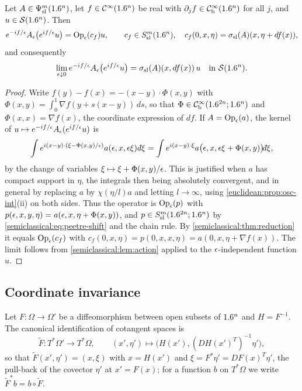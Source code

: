 \begin{proposition}\label{semiclassical:prop:oscillatory}
  Let $A\in\Psi^{m}_{\mathrm{sl}}(1.6^n)$, let $f\in\mathcal{C}^\infty(1.6^n)$ be real with $\partial_jf\in\mathcal{C}^\infty_{\mathrm{b}}(1.6^n)$
  for all $j$, and $u\in\mathcal{S}(1.6^n)$. Then
  \begin{equation*}
    e^{-if/\epsilon}A_\epsilon\bigl(e^{if/\epsilon}u\bigr)=\operatorname{Op}_\epsilon(c_f)u,\qquad c_f\in S^{m}_{\mathrm{sl}}(1.6^n),\quad
    c_f(0,x,\eta)=\sigma_{\mathrm{sl}}(A)(x,\eta+df(x)),
  \end{equation*}
  and consequently
  \begin{equation*}
    \lim_{\epsilon\downarrow0}e^{-if/\epsilon}A_\epsilon\bigl(e^{if/\epsilon}u\bigr)=\sigma_{\mathrm{sl}}(A)(x,df(x))\,u
    \quad\text{in }\mathcal{S}(1.6^n).
  \end{equation*}
\end{proposition}
\begin{proof}
  Write $f(y)-f(x)=-(x-y)\cdot\Phi(x,y)$ with
  $\Phi(x,y)=\int_0^1\nabla f(y+s(x-y))\,ds$, so that $\Phi\in\mathcal{C}^\infty_{\mathrm{b}}(1.6^{2n};1.6^n)$ and
  $\Phi(x,x)=\nabla f(x)$, the coordinate expression of $df$. If $A=\operatorname{Op}_\epsilon(a)$,
  the kernel of $u\mapsto e^{-if/\epsilon}A_\epsilon(e^{if/\epsilon}u)$ is
  \begin{equation*}
    \int e^{i(x-y)\cdot(\xi-\Phi(x,y)/\eps)}a(\eps,x,\eps\xi)\,\dbar\xi
    =\int e^{i(x-y)\cdot\xi}a\bigl(\eps,x,\eps\xi+\Phi(x,y)\bigr)\dbar\xi ,
  \end{equation*}
  by the change of variables $\xi\mapsto\xi+\Phi(x,y)/\epsilon$. This is justified
  when $a$ has compact support in $\eta$, the integrals then being absolutely
  convergent, and in general by replacing $a$ by $\chi(\eta/l)a$ and letting
  $l\to\infty$, using \cref{euclidean:prop:osc-int}(ii) on both sides. Thus the
  operator is $\operatorname{Op}_\epsilon(p)$ with $p(\epsilon,x,y,\eta)=a(\epsilon,x,\eta+\Phi(x,y))$, and
  $p\in S^{m}_{\mathrm{sl}}(1.6^{2n};1.6^n)$ by \eqref{semiclassical:eq:peetre-shift} and the chain
  rule. By \cref{semiclassical:thm:reduction} it equals $\operatorname{Op}_\epsilon(c_f)$ with
  $c_f(0,x,\eta)=p(0,x,x,\eta)=a(0,x,\eta+\nabla f(x))$. The limit follows from
  \cref{semiclassical:lem:action} applied to the $\epsilon$-independent function $u$.
\end{proof}

\subsection{Coordinate invariance}
Let $F:\Omega\to\Omega'$ be a diffeomorphism between open subsets of $1.6^n$ and
$H=F^{-1}$. The canonical identification of cotangent spaces is
\begin{equation*}
  \tilde F:T^*\Omega'\to T^*\Omega,\qquad
  (x',\eta')\mapsto\bigl(H(x'),(DH(x')^T)^{-1}\eta'\bigr),
\end{equation*}
so that $\tilde F(x',\eta')=(x,\xi)$ with $x=H(x')$ and $\xi=F^*\eta'=DF(x)^T\eta'$, the
pull-back of the covector $\eta'$ at $x'=F(x)$; for a function $b$ on $T^*\Omega$ we write
$\tilde F^*b=b\circ\tilde F$.

